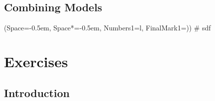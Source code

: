 \documentclass[12pt, a4paper]{article}
\newcommand{\listSpace}{-0.5em}%
\begin{document}
\subsection{Combining Models}
\begin{easylist}[itemize]
	\ListProperties(Space=\listSpace, Space*=\listSpace, Numbers1=l, FinalMark1={)})
	# sdf
\end{easylist}

















\clearpage
\section{Exercises}

\subsection{Introduction}
\end{document}
